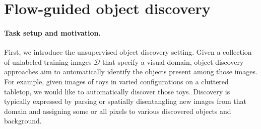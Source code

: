 \documentclass{article}
\begin{document}
    





\section{Flow-guided object discovery}
\label{sec:approach}

\paragraph{Task setup and motivation.} First, we introduce the unsupervised object discovery setting. Given a collection of unlabeled training images $\mathcal{D}$ that specify a visual domain, object discovery approaches aim to automatically identify the objects present among those images. For example, given images of toys in varied configurations on a cluttered tabletop, we would like to automatically discover those toys. Discovery is typically expressed by parsing or spatially disentangling new images from that domain and assigning some or all pixels to various discovered objects and background.
\end{document}

